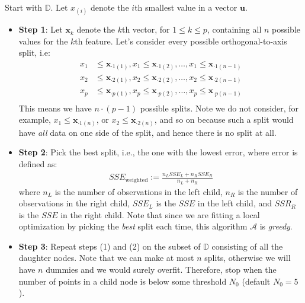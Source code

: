 \documentclass[12pt]{article}
\begin{document}

\begin{enumerate}

	Start with $\mathbb{D}$. Let $x_{(i)}$ denote the $i$th smallest
value in a vector $\bm{u}$.
\begin{itemize}
	\item \textbf{Step 1}: Let $\bm{x}_k$ denote the $k$th vector, for $1\leq k\leq p$,
	containing all $n$ possible values for the $k$th feature.
	Let's consider every possible orthogonal-to-axis split, i.e:
	\begin{align*}
		x_1&\leq \bm{x}_{\cdot 1(1)}, x_1 \leq \bm{x}_{\cdot 1(2)}, \ldots, x_1 \leq \bm{x}_{\cdot 1(n-1)}\\
		x_2&\leq \bm{x}_{\cdot 2(1)}, x_2 \leq \bm{x}_{\cdot 2(2)}, \ldots, x_2 \leq \bm{x}_{\cdot 2(n-1)}\\
		x_p&\leq \bm{x}_{\cdot p(1)}, x_p \leq \bm{x}_{\cdot p(2)}, \ldots, x_p \leq \bm{x}_{\cdot p(n-1)}\\
	\end{align*}
	This means we have $n\cdot (p-1)$ possible splits. Note we do not
	consider, for example, $x_1\leq \bm{x}_{\cdot 1(n)}$,
	or $x_2\leq \bm{x}_{\cdot 2(n)}$, and so on because such a split
	would have \textit{all} data on one side of the split, and hence
	there is no split at all.
	\item \textbf{Step 2}: Pick the best split, i.e., the one with the lowest error,
	where error is defined as:
	\begin{align*}
		SSE_{\text{weighted}} := \frac{n_L SSE_L + n_R SSE_R}{n_L + n_R}
	\end{align*}
	where $n_L$ is the number of observations in the left child,
	$n_R$ is the number of observations in the right child, $SSE_L$
	is the $SSE$ in the left child, and $SSR_R$ is the $SSE$ in
	the right child. Note that since we are fitting a local
	optimization by picking the \textit{best} split each time, this
	algorithm $\mathcal{A}$ is \textit{greedy}.
	\item \textbf{Step 3}: Repeat steps (1) and (2) on the subset of $\mathbb{D}$
	consisting of all the daughter nodes. Note that we can make
	at most $n$ splits, otherwise we will have $n$ dummies and we
	would surely overfit. Therefore, stop when the number of points
	in a child node is below some threshold $N_0$ (default $N_0 = 5$).
\end{itemize}


\end{enumerate}
\end{document}
